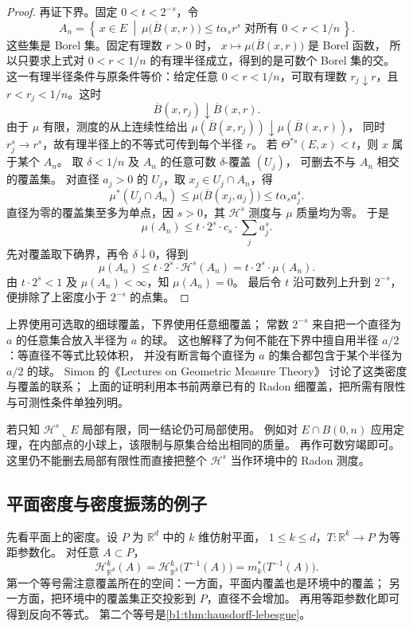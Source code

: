 \begin{proof}
再证下界。固定 \(0<t<2^{-s}\)，令
\[
 A_n=\left\{\,x\in E\ \middle|\
       \mu\bigl(\overline B(x,r)\bigr)\leq t\alpha_s r^s
       \text{ 对所有 }0<r<1/n\,\right\}.
\]
这些集是 Borel 集。固定有理数 \(r>0\) 时，
\(x\mapsto\mu\bigl(\overline B(x,r)\bigr)\) 是 Borel 函数，
所以只要求上式对 \(0<r<1/n\) 的有理半径成立，得到的是可数个 Borel 集的交。
这一有理半径条件与原条件等价：给定任意 \(0<r<1/n\)，可取有理数
\(r_j\downarrow r\)，且 \(r<r_j<1/n\)。这时
\[
 \overline B(x,r_j)\downarrow\overline B(x,r).
\]
由于 \(\mu\) 有限，测度的从上连续性给出
\(\mu(\overline B(x,r_j))\downarrow\mu(\overline B(x,r))\)，
同时 \(r_j^s\to r^s\)，故有理半径上的不等式可传到每个半径 \(r\)。
若 \(\Theta^{*s}(E,x)<t\)，则 \(x\) 属于某个 \(A_n\)。
取 \(\delta<1/n\) 及 \(A_n\) 的任意可数 \(\delta\)-覆盖 \((U_j)\)，
可删去不与 \(A_n\) 相交的覆盖集。
对直径 \(a_j>0\) 的 \(U_j\)，取 \(x_j\in U_j\cap A_n\)，得
\[
 \mu^*(U_j\cap A_n)
 \leq\mu\bigl(\overline B(x_j,a_j)\bigr)
 \leq t\alpha_s a_j^s.
\]
直径为零的覆盖集至多为单点，因 \(s>0\)，其 \(\mathcal H^s\) 测度与 \(\mu\) 质量均为零。
于是
\[
 \mu(A_n)\leq t\cdot2^s\cdot c_s\cdot\sum_j a_j^s.
\]
先对覆盖取下确界，再令 \(\delta\downarrow0\)，得到
\[
 \mu(A_n)\leq t\cdot2^s\cdot\mathcal H^s(A_n)=t\cdot2^s\cdot\mu(A_n).
\]
由 \(t\cdot2^s<1\) 及 \(\mu(A_n)<\infty\)，知 \(\mu(A_n)=0\)。
最后令 \(t\) 沿可数列上升到 \(2^{-s}\)，便排除了上密度小于 \(2^{-s}\) 的点集。
\end{proof}

上界使用可选取的细球覆盖，下界使用任意细覆盖；
常数 \(2^{-s}\) 来自把一个直径为 \(a\) 的任意集合放入半径为 \(a\) 的球。
这也解释了为何不能在下界中擅自用半径 \(a/2\)：等直径不等式比较体积，
并没有断言每个直径为 \(a\) 的集合都包含于某个半径为 \(a/2\) 的球。
Simon 的《Lectures on Geometric Measure Theory》%
\cite[\S3]{Simon1983Lectures}讨论了这类密度与覆盖的联系；
上面的证明利用本书前两章已有的 Radon 细覆盖，把所需有限性与可测性条件单独列明。

\ProseParagraphBreak

若只知 \(\mathcal H^s\llcorner E\) 局部有限，同一结论仍可局部使用。
例如对 \(E\cap B(0,n)\) 应用定理，在内部点的小球上，该限制与原集合给出相同的质量。
再作可数穷竭即可。这里仍不能删去局部有限性而直接把整个
\(\mathcal H^s\) 当作环境中的 Radon 测度。

\subsection{平面密度与密度振荡的例子}
\label{b1:subsec:150503}

先看平面上的密度。设 \(P\) 为 \(\mathbb R^d\) 中的 \(k\) 维仿射平面，
\(1\leq k\leq d\)，\(T:\mathbb R^k\rightarrow P\) 为等距参数化。
对任意 \(A\subset P\)，
\begin{equation}\label{b1:eq:hausdorff-plane-identification}
 \mathcal H^k_{\mathbb R^d}(A)
 =\mathcal H^k_{\mathbb R^k}\bigl(T^{-1}(A)\bigr)
 =m_k^*\bigl(T^{-1}(A)\bigr).
\end{equation}
第一个等号需注意覆盖所在的空间：一方面，平面内覆盖也是环境中的覆盖；
另一方面，把环境中的覆盖集正交投影到 \(P\)，直径不会增加。
再用等距参数化即可得到反向不等式。
第二个等号是\cref{b1:thm:hausdorff-lebesgue}。

